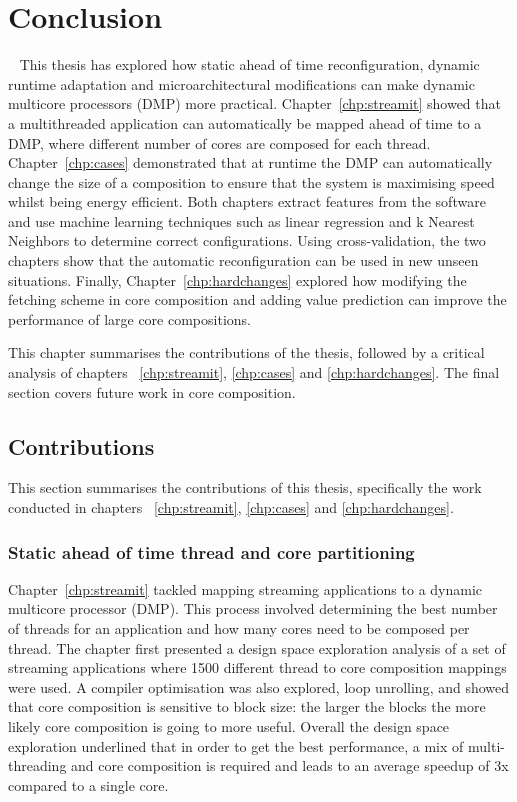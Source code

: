 \chapter{Conclusion}~\label{chp:conclusion}
This thesis has explored how static ahead of time reconfiguration, dynamic runtime adaptation and microarchitectural modifications can make dynamic multicore processors (DMP) more practical.
Chapter~\ref{chp:streamit} showed that a multithreaded application can automatically be mapped ahead of time to a DMP, where different number of cores are composed for each thread.
Chapter~\ref{chp:cases} demonstrated that at runtime the DMP can automatically change the size of a composition to ensure that the system is maximising speed whilst being energy efficient.
Both chapters extract features from the software and use machine learning techniques such as linear regression and k Nearest Neighbors to determine correct configurations.
Using cross-validation, the two chapters show that the automatic reconfiguration can be used in new unseen situations.
Finally, Chapter~\ref{chp:hardchanges} explored how modifying the fetching scheme in core composition and adding value prediction can improve the performance of large core compositions.

This chapter summarises the contributions of the thesis, followed by a critical analysis of chapters ~\ref{chp:streamit}, \ref{chp:cases} and \ref{chp:hardchanges}.
The final section covers future work in core composition.

\section{Contributions}
This section summarises the contributions of this thesis, specifically the work conducted in chapters  ~\ref{chp:streamit}, \ref{chp:cases} and \ref{chp:hardchanges}.
\subsection{Static ahead of time thread and core partitioning}

Chapter~\ref{chp:streamit} tackled mapping streaming applications to a dynamic multicore processor (DMP).
This process involved determining the best number of threads for an application and how many cores need to be composed per thread.
The chapter first presented a design space exploration analysis of a set of streaming applications where 1500 different thread to core composition mappings were used.
A compiler optimisation was also explored, loop unrolling, and showed that core composition is sensitive to block size: the larger the blocks the more likely core composition is going to more useful.
Overall the design space exploration underlined that in order to get the best performance, a mix of multi-threading and core composition is required and leads to an average speedup of 3x compared to a single core.
 
